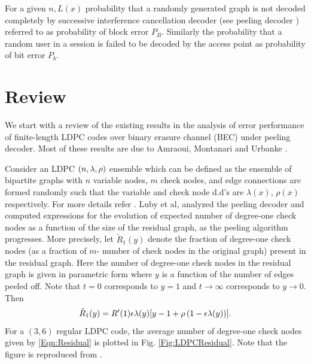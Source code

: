For a given $n, L(x)$ probability that a randomly generated graph is not decoded completely by successive interference cancellation decoder (see peeling decoder \cite{richardson2008modern}) referred to as probability of block error $P_{B}$. Similarly the probability that a random user in a session is failed to be decoded by the access point as probability of bit error $P_{b}$.

 
\section{Review}
We start with a review of the existing results in the analysis of error performance of finite-length LDPC codes over binary erasure channel (BEC) under peeling decoder. Most of these results are due to Amraoui, Montanari and Urbanke \cite{amraoui2007find}.

Consider an LDPC  $(n,\lambda,\rho)$ ensemble which can be defined as the ensemble of bipartite graphs with $n$ variable nodes, $m$ check nodes, and edge connections are formed randomly such that the variable and check node d.d's are $\lambda(x)$, $\rho(x)$ respectively. For more details refer \cite{richardson2008modern}. Luby et al, \cite{luby1997practical} analyzed the peeling decoder and computed expressions for the evolution of expected number of degree-one check nodes as a function of the size of the residual graph, as the peeling algorithm progresses. More precisely, let $\tilde{R}_{1}(y)$ denote the fraction of degree-one check nodes (as a fraction of $m$- number of check nodes in the original graph) present in the residual graph. Here the number of degree-one check nodes in the residual graph is given in parametric form where $y$ is a function of the number of edges peeled off. Note that $t=0$ corresponds to $y=1$ and $t\rightarrow \infty$ corresponds to $y\rightarrow 0$. Then
\begin{align}
\tilde{R}_{1}(y)=R'(1)\epsilon\lambda(y)[y-1+\rho\left(1-\epsilon\lambda(y)\right) ].
\label{Eqn:Residual}
\end{align}
For a $(3,6)$ regular LDPC code, the average number of degree-one check nodes given by \eqref{Eqn:Residual} is plotted in Fig. \ref{Fig:LDPCResidual}. Note that the figure is reproduced from \cite{amraoui2007find}.

